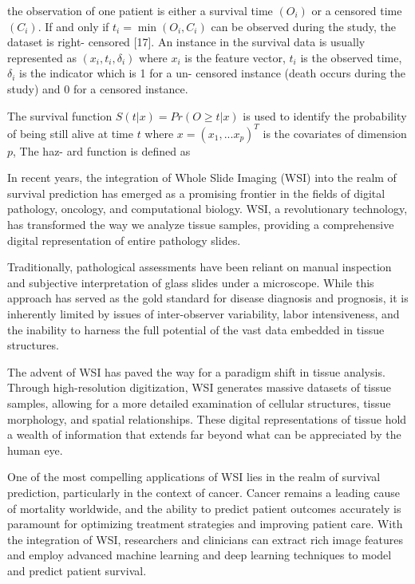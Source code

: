 \documentclass[journal,twoside,web]{ieeecolor}
\begin{document}
the observation of one patient is either a survival time $(O_i)$ or a censored time $(C_i).$ If and only if $t_i=\min(O_i,C_i)$ can be observed during the study, the dataset is right- censored [17]. An instance in the survival data is usually represented as $(x_i,t_i,\delta_i)$ where $x_i$ is the feature vector, $t_i$ is the observed time, $\delta_i$ is the indicator which is 1 for a un- censored instance (death occurs during the study) and 0 for a censored instance.

The survival function $S(t|x)=Pr(O\geq t|x)$ is used to identify the probability of being still alive at time $t$ where $x=(x_1,...x_p)^T$ is the covariates of dimension $p$, The haz- ard function is defined as

In recent years, the integration of Whole Slide Imaging (WSI) into the realm of survival prediction has emerged as a promising frontier in the fields of digital pathology, oncology, and computational biology. WSI, a revolutionary technology, has transformed the way we analyze tissue samples, providing a comprehensive digital representation of entire pathology slides.

Traditionally, pathological assessments have been reliant on manual inspection and subjective interpretation of glass slides under a microscope. While this approach has served as the gold standard for disease diagnosis and prognosis, it is inherently limited by issues of inter-observer variability, labor intensiveness, and the inability to harness the full potential of the vast data embedded in tissue structures.

The advent of WSI has paved the way for a paradigm shift in tissue analysis. Through high-resolution digitization, WSI generates massive datasets of tissue samples, allowing for a more detailed examination of cellular structures, tissue morphology, and spatial relationships. These digital representations of tissue hold a wealth of information that extends far beyond what can be appreciated by the human eye.

One of the most compelling applications of WSI lies in the realm of survival prediction, particularly in the context of cancer. Cancer remains a leading cause of mortality worldwide, and the ability to predict patient outcomes accurately is paramount for optimizing treatment strategies and improving patient care. With the integration of WSI, researchers and clinicians can extract rich image features and employ advanced machine learning and deep learning techniques to model and predict patient survival.
\end{document}
